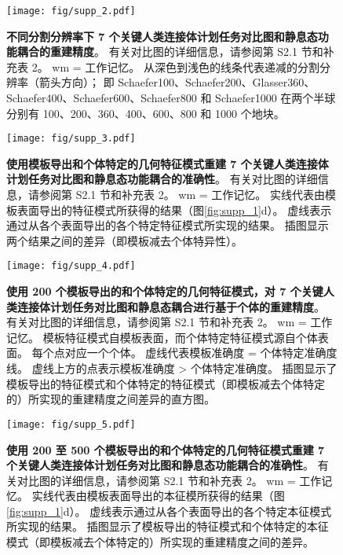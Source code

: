 \documentclass[lang=cn,a4paper,newtx]{elegantpaper}
\begin{document}
\begin{figure}[!htb] 
	\centering
	\texttt{[image: fig/supp\_2.pdf]}
	\caption{\textbf{不同分割分辨率下 7 个关键人类连接体计划任务对比图和静息态功能耦合的重建精度}。 
		有关对比图的详细信息，请参阅第 S2.1 节和补充表 2。
		wm = 工作记忆。
		从深色到浅色的线条代表递减的分割分辨率（箭头方向）；
		即 Schaefer100、Schaefer200、Glasser360、Schaefer400、Schaefer600、Schaefer800 和 Schaefer1000 在两个半球分别有 100、200、360、400、600、800 和 1000 个地块。} \label{fig:supp_2}
\end{figure}



\begin{figure}[!htb] 
	\centering
	\texttt{[image: fig/supp\_3.pdf]}
	\caption{\textbf{使用模板导出和个体特定的几何特征模式重建 7 个关键人类连接体计划任务对比图和静息态功能耦合的准确性}。
		有关对比图的详细信息，请参阅第 S2.1 节和补充表 2。 
		wm = 工作记忆。
		实线代表由模板表面导出的特征模式所获得的结果（图\ref{fig:supp_1}d）。
		虚线表示通过从各个表面导出的各个特定特征模式所实现的结果。
		插图显示两个结果之间的差异（即模板减去个体特异性）。} \label{fig:supp_3}
\end{figure}




\begin{figure}[!htb] 
	\centering
	\texttt{[image: fig/supp\_4.pdf]}
	\caption{\textbf{使用 200 个模板导出的和个体特定的几何特征模式，对 7 个关键人类连接体计划任务对比图和静息态耦合进行基于个体的重建精度}。
		有关对比图的详细信息，请参阅第 S2.1 节和补充表 2。
		wm = 工作记忆。
		模板特征模式自模板表面，而个体特定特征模式源自个体表面。
		每个点对应一个个体。
		虚线代表模板准确度 = 个体特定准确度线。
		虚线上方的点表示模板准确度 > 个体特定准确度。
		插图显示了模板导出的特征模式和个体特定的特征模式（即模板减去个体特定的）所实现的重建精度之间差异的直方图。} \label{fig:supp_4}
\end{figure}


\begin{figure}[!htb] 
	\centering
	\texttt{[image: fig/supp\_5.pdf]}
	\caption{\textbf{使用 200 至 500 个模板导出的和个体特定的几何特征模式重建 7 个关键人类连接体计划任务对比图和静息态功能耦合的准确性}。
		有关对比图的详细信息，请参阅第 S2.1 节和补充表 2。
		wm = 工作记忆。
		实线代表由模板表面导出的本征模所获得的结果（图\ref{fig:supp_1}d）。
		虚线表示通过从各个表面导出的各个特定本征模式所实现的结果。
		插图显示了模板导出的特征模式和个体特定的本征模式（即模板减去个体特定的）所实现的重建精度之间的差异。} \label{fig:supp_5}
\end{figure}
\end{document}
